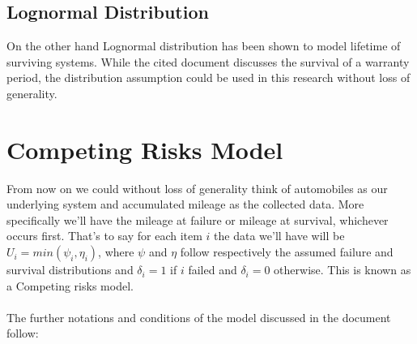 \documentclass{article}
\begin{document}
\subsection{Lognormal Distribution}
\indent On the other hand Lognormal distribution has been shown \cite{rai_singh} to model lifetime of surviving systems. While the cited document discusses the survival of a warranty period, the distribution assumption could be used in this research without loss of generality.
\section{Competing Risks Model}
\indent \indent From now on we could without loss of generality think of automobiles as our underlying system and accumulated mileage as the collected data. More specifically we'll have the mileage at failure or mileage at survival, whichever occurs first. That's to say for each item $i$ the data we'll have will be $U_i = min(\psi_i, \eta_i)$, where $\psi$ and $\eta$ follow respectively the assumed failure and survival distributions and $\delta_i = 1$ if $i$ failed and $\delta_i = 0$ otherwise. This is known as a Competing risks model.
\\
\\
\indent The further notations and conditions of the model discussed in the document follow: 
\end{document}
